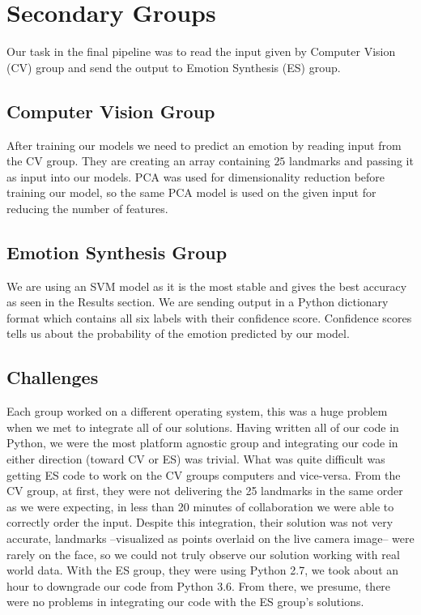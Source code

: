 \section{Secondary Groups}

Our task in the final pipeline was to read the input given by Computer Vision (CV) group and send the output to Emotion Synthesis (ES) group.

\subsection{Computer Vision Group}
After training our models we need to predict an emotion by reading input from the CV group. They are creating an array containing $25$ landmarks and passing it as input into our models. PCA was used for dimensionality reduction before training our model, so the same PCA model is used on the given input for reducing the number of features.

\subsection{Emotion Synthesis Group}
We are using an SVM model as it is the most stable and gives the best accuracy as seen in the Results section. We are sending output in a Python dictionary format which contains all six labels with their confidence score. Confidence scores tells us about the probability of the emotion predicted by our model. %

\subsection{Challenges}
Each group worked on a different operating system, this was a huge problem when we met to integrate all of our solutions. Having written all of our code in Python, we were the most platform agnostic group and integrating our code in either direction (toward CV or ES) was trivial. What was quite difficult was getting ES code to work on the CV groups computers and vice-versa. From the CV group, at first, they were not delivering the 25 landmarks in the same order as we were expecting, in less than 20 minutes of collaboration we were able to correctly order the input. Despite this integration, their solution was not very accurate, landmarks --visualized as points overlaid on the live camera image-- were rarely on the face, so we could not truly observe our solution working with real world data. With the ES group, they were using Python 2.7, we took about an hour to downgrade our code from Python 3.6. From there, we presume, there were no problems in integrating our code with the ES group's solutions.
